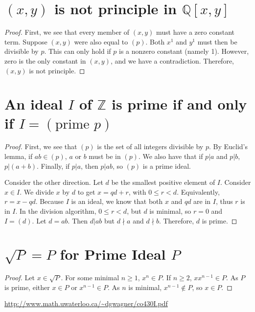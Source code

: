 \documentclass[12pt]{article}
\begin{document}
\section{$(x, y)$ is not principle in $\mathbb{Q}[x,y]$}
\begin{proof}
First, we see that every member of $(x, y)$ must have a zero constant term. Suppose $(x, y)$ were also equal to $(p)$. Both $x^1$ and $y^1$ must then be divisible by $p$. This can only hold if $p$ is a nonzero constant (namely 1). However, zero is the only constant in $(x, y)$, and we have a contradiction. Therefore, $(x, y)$ is not principle. 
\end{proof}


\section{An ideal $I$ of $\mathbb{Z}$ is prime if and only if $I = (\text{prime } p)$}
\begin{proof}
First, we see that $(p)$ is the set of all integers divisible by $p$. By Euclid's lemma, if $ab \in (p)$,  $a$ or $b$ must be in $(p)$. We also have that if $p | a$ and $p | b$, $p | (a + b)$. Finally, if $p | a$, then $p | ab$, so $(p)$ is a prime ideal.

Consider the other direction. Let $d$ be the smallest positive element of $I$. Consider $x \in I$. We divide $x$ by $d$ to get $x = qd + r$, with $0 \leq r < d$. Equivalently, $r = x - qd$. Because $I$ is an ideal, we know that both $x$ and $qd$ are in $I$, thus $r$ is in $I$. In the division algorithm, $0 \leq r < d$, but $d$ is minimal, so $r = 0$ and $I = (d)$. Let $d = ab$. Then $d | ab$ but $d \nmid a$ and $d \nmid b$. Therefore, $d$ is prime.
\end{proof}

\section{$\sqrt{P} = P$ for Prime Ideal $P$}
\begin{proof}
Let $x \in \sqrt{P}$. For some minimal $n \geq 1$, $x ^ n \in P$. If $n \geq 2$, $x x^{n - 1} \in P$. As $P$ is prime, either $x \in P$ or $x ^ {n - 1} \in P$. As $n$ is minimal, $x ^ {n - 1} \notin P$, so $x \in P$. 
\end{proof}

\begin{thebibliography}{2}
 \url{http://www.math.uwaterloo.ca/~dgwagner/co430I.pdf}
\end{thebibliography}
\end{document}
